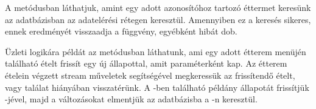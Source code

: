 A  metódusban láthatjuk, amint egy adott azonosítóhoz tartozó éttermet keresünk az adatbázisban az adatelérési rétegen keresztül. Amennyiben ez a keresés sikeres, ennek eredményét visszaadja a függvény, egyébként hibát dob. \par

Üzleti logikára példát az  metódusban láthatunk, ami egy adott étterem menüjén található ételt frissít egy új állapottal, amit paraméterként kap. Az étterem ételein végzett stream műveletek segítségével megkeressük az frissítendő ételt, vagy találat hiányában visszatérünk. A -ben található példány állapotát frissítjük -jével, majd a változásokat elmentjük az adatbázisba a -n keresztül. \par